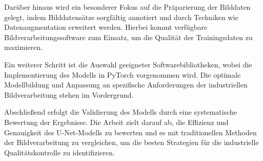 Darüber hinaus wird ein besonderer Fokus auf die Präparierung der Bilddaten gelegt, indem Bilddatensätze sorgfältig annotiert und durch Techniken wie Datenaugmentation erweitert werden. Hierbei kommt verfügbare Bildverarbeitungssoftware zum Einsatz, um die Qualität der Trainingsdaten zu maximieren.

Ein weiterer Schritt ist die Auswahl geeigneter Softwarebibliotheken, wobei die Implementierung des Modells in PyTorch vorgenommen wird. Die optimale Modellbildung und Anpassung an spezifische Anforderungen der industriellen Bildverarbeitung stehen im Vordergrund.

Abschließend erfolgt die Validierung des Modells durch eine systematische Bewertung der Ergebnisse. Die Arbeit zielt darauf ab, die Effizienz und Genauigkeit des U-Net-Modells zu bewerten und es mit traditionellen Methoden der Bildverarbeitung zu vergleichen, um die besten Strategien für die industrielle Qualitätskontrolle zu identifizieren.
